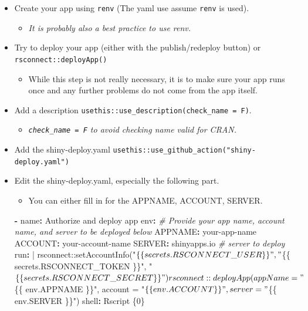 \documentclass[
]{book}
\newenvironment{Shaded}{\begin{snugshade}}{\end{snugshade}}
\newcommand{\AttributeTok}[1]{\textcolor[rgb]{0.77,0.63,0.00}{#1}}
\newcommand{\CharTok}[1]{\textcolor[rgb]{0.31,0.60,0.02}{#1}}
\newcommand{\CommentTok}[1]{\textcolor[rgb]{0.56,0.35,0.01}{\textit{#1}}}
\newcommand{\FunctionTok}[1]{\textcolor[rgb]{0.00,0.00,0.00}{#1}}
\newcommand{\KeywordTok}[1]{\textcolor[rgb]{0.13,0.29,0.53}{\textbf{#1}}}
\newcommand{\NormalTok}[1]{#1}
\providecommand{\tightlist}{%
  \setlength{\itemsep}{0pt}\setlength{\parskip}{0pt}}
\begin{document}
\begin{itemize}
\item
  Create your app using \texttt{renv} (The yaml use assume \texttt{renv} is used).

  \begin{itemize}
  \tightlist
  \item
    \emph{It is probably also a best practice to use renv.}
  \end{itemize}
\item
  Try to deploy your app (either with the publish/redeploy button) or \texttt{rsconnect::deployApp()}

  \begin{itemize}
  \tightlist
  \item
    While this step is not really necessary, it is to make sure your app runs once and any further problems do not come from the app itself.
  \end{itemize}
\item
  Add a description \texttt{usethis::use\_description(check\_name\ =\ F)}.

  \begin{itemize}
  \tightlist
  \item
    \emph{\texttt{check\_name\ =\ F} to avoid checking name valid for CRAN.}
  \end{itemize}
\item
  Add the shiny-deploy.yaml \texttt{usethis::use\_github\_action("shiny-deploy.yaml")}
\item
  Edit the shiny-deploy.yaml, especially the following part.

  \begin{itemize}
  \tightlist
  \item
    You can either fill in for the APPNAME, ACCOUNT, SERVER.
  \end{itemize}

\begin{Shaded}
\begin{Highlighting}[]
\AttributeTok{  }\KeywordTok{{-}}\AttributeTok{ }\FunctionTok{name}\KeywordTok{:}\AttributeTok{ Authorize and deploy app}
\AttributeTok{    }\FunctionTok{env}\KeywordTok{:}\AttributeTok{ }
\CommentTok{      \# Provide your app name, account name, and server to be deployed below}
\AttributeTok{      }\FunctionTok{APPNAME}\KeywordTok{:}\AttributeTok{ your{-}app{-}name}
\AttributeTok{      }\FunctionTok{ACCOUNT}\KeywordTok{:}\AttributeTok{ your{-}account{-}name}
\AttributeTok{      }\FunctionTok{SERVER}\KeywordTok{:}\AttributeTok{ shinyapps.io}\CommentTok{ \# server to deploy}
\FunctionTok{    run}\KeywordTok{: }\CharTok{|}
\NormalTok{      rsconnect::setAccountInfo("$\{\{ secrets.RSCONNECT\_USER \}\}", "$\{\{ secrets.RSCONNECT\_TOKEN \}\}", "$\{\{ secrets.RSCONNECT\_SECRET \}\}")}
\NormalTok{      rsconnect::deployApp(appName = "$\{\{ env.APPNAME \}\}", account = "$\{\{ env.ACCOUNT \}\}", server = "$\{\{ env.SERVER \}\}")}
\AttributeTok{    }\FunctionTok{shell}\KeywordTok{:}\AttributeTok{ Rscript \{0\}}
\end{Highlighting}
\end{Shaded}


\end{itemize}
\end{document}
